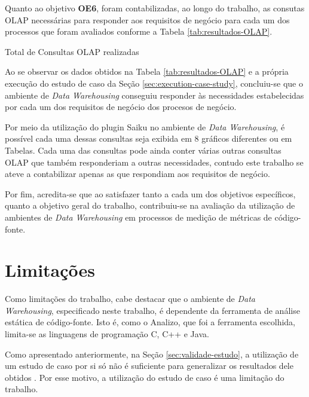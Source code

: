 Quanto ao objetivo \textbf{OE6}, foram contabilizadas, ao longo do trabalho, as consutas OLAP necessárias para responder aos requisitos de negócio para cada um dos processos que foram avaliados conforme a Tabela \ref{tab:resultados-OLAP}.

 
\begin{table}[H]
\begin{center}

\caption{Total de Consultas OLAP realizadas}
\label{tab:resultados-OLAP}
\end{center}
\end{table}
\FloatBarrier


Ao se observar os dados obtidos na Tabela \ref{tab:resultados-OLAP} e a própria execução do estudo de caso da Seção \ref{sec:execution-case-study}, concluiu-se que o ambiente de \textit{Data Warehousing} conseguiu responder às necessidades estabelecidas por cada um dos requisitos de negócio dos procesos de negócio. 

Por meio da utilização do plugin Saiku no ambiente de \textit{Data Warehousing}, é possível cada uma dessas consultas seja exibida em 8 gráficos diferentes ou em Tabelas. Cada uma das consultas pode ainda conter várias outras consultas OLAP que também responderiam a outras necessidades, contudo este trabalho se ateve a contabilizar apenas as que respondiam aos requisitos de negócio.

Por fim, acredita-se que ao satisfazer tanto a cada um dos objetivos específicos, quanto a objetivo geral do trabalho, contribuiu-se na avaliação da utilização de ambientes de \textit{Data Warehousing} em processos de medição de métricas de código-fonte. 

\section{Limitações}

Como limitações do trabalho, cabe destacar que o ambiente de \textit{Data Warehousing}, especificado neste trabalho, é dependente da ferramenta de análise estática de código-fonte. Isto é, como o Analizo, que foi a ferramenta escolhida, limita-se as linguagens de programação C, C++ e Java.

Como apresentado anteriormente, na Seção \ref{sec:validade-estudo}, a utilização de um estudo de caso por si só não é suficiente para generalizar os resultados dele obtidos \cite{yin2011applications}. Por esse motivo, a utilização do estudo de caso é uma limitação do trabalho.

